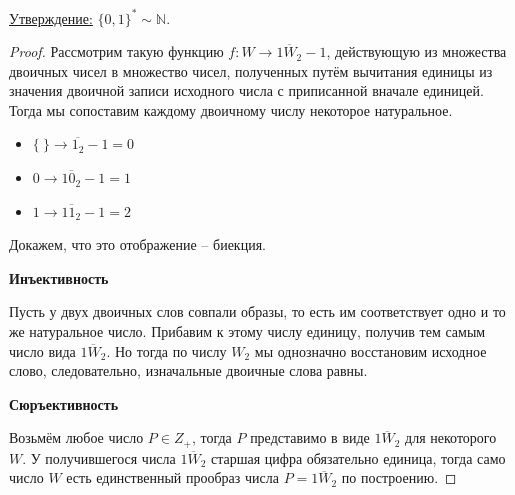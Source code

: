 \documentclass[a4paper, 12pt]{article}
\newcommand{\statement}{\underline{Утверждение:} }
\newcommand{\N}{\mathbb{N}}
\begin{document}
\statement $\{ 0, 1\}^* \sim \N$.
\begin{proof}

    Рассмотрим такую функцию $f: W \to \overline{1W_{2}} - 1$, действующую из множества двоичных чисел в множество чисел, полученных путём вычитания единицы из значения двоичной записи исходного числа с приписанной вначале единицей. Тогда мы сопоставим каждому двоичному числу некоторое натуральное.
    
    \begin{itemize}
        \item $\{\ \} \to \overline{1_{2}} - 1 = 0$
        \item $0 \to \overline{10_{2}} - 1 = 1$
        \item $1 \to \overline{11_{2}} - 1 = 2$
    \end{itemize}
    
    Докажем, что это отображение -- биекция.
    
    \textbf{Инъективность}
    
        Пусть у двух двоичных слов совпали образы, то есть им соответствует одно и то же натуральное число. Прибавим к этому числу единицу, получив тем самым число вида $\overline{1W_{2}}$. Но тогда по числу $W_{2}$ мы однозначно восстановим исходное слово, следовательно, изначальные двоичные слова равны.
        
    \textbf{Сюръективность}
    
        Возьмём любое число $P \in Z_{+}$, тогда $P$ представимо в виде $\overline{1W_{2}}$ для некоторого $W$. У получившегося числа $\overline{1W_{2}}$ старшая цифра обязательно единица, тогда само число $W$ есть единственный прообраз числа $P = \overline{1W_{2}}$ по построению.
    
\end{proof}
\end{document}
